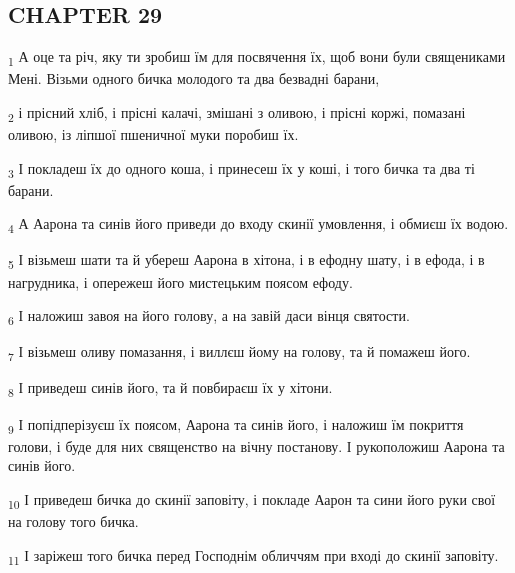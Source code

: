 \subsection{CHAPTER 29}
\begin{tcolorbox}
\textsubscript{1} А оце та річ, яку ти зробиш їм для посвячення їх, щоб вони були священиками Мені. Візьми одного бичка молодого та два безвадні барани,
\end{tcolorbox}
\begin{tcolorbox}
\textsubscript{2} і прісний хліб, і прісні калачі, змішані з оливою, і прісні коржі, помазані оливою, із ліпшої пшеничної муки поробиш їх.
\end{tcolorbox}
\begin{tcolorbox}
\textsubscript{3} І покладеш їх до одного коша, і принесеш їх у коші, і того бичка та два ті барани.
\end{tcolorbox}
\begin{tcolorbox}
\textsubscript{4} А Аарона та синів його приведи до входу скинії умовлення, і обмиєш їх водою.
\end{tcolorbox}
\begin{tcolorbox}
\textsubscript{5} І візьмеш шати та й убереш Аарона в хітона, і в ефодну шату, і в ефода, і в нагрудника, і опережеш його мистецьким поясом ефоду.
\end{tcolorbox}
\begin{tcolorbox}
\textsubscript{6} І наложиш завоя на його голову, а на завій даси вінця святости.
\end{tcolorbox}
\begin{tcolorbox}
\textsubscript{7} І візьмеш оливу помазання, і виллєш йому на голову, та й помажеш його.
\end{tcolorbox}
\begin{tcolorbox}
\textsubscript{8} І приведеш синів його, та й повбираєш їх у хітони.
\end{tcolorbox}
\begin{tcolorbox}
\textsubscript{9} І попідперізуєш їх поясом, Аарона та синів його, і наложиш їм покриття голови, і буде для них священство на вічну постанову. І рукоположиш Аарона та синів його.
\end{tcolorbox}
\begin{tcolorbox}
\textsubscript{10} І приведеш бичка до скинії заповіту, і покладе Аарон та сини його руки свої на голову того бичка.
\end{tcolorbox}
\begin{tcolorbox}
\textsubscript{11} І заріжеш того бичка перед Господнім обличчям при вході до скинії заповіту.
\end{tcolorbox}

